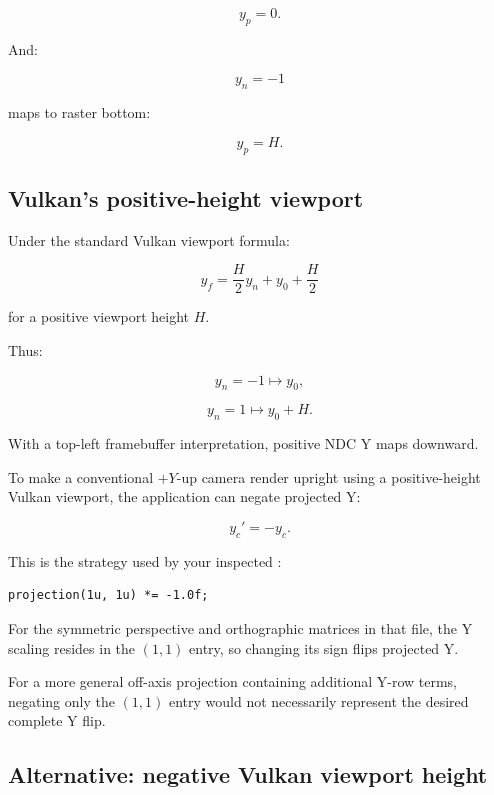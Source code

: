 \[
 y_p=0.
\]

And:

\[
 y_n=-1
\]

maps to raster bottom:

\[
 y_p=H.
\]

\subsection{Vulkan's positive-height viewport}\label{02-foundations-ii-ch033-vulkans-positive-height-viewport}

\hypertarget{02-foundations-ii-ch033-vulkans-positive-height-viewport}{}

Under the standard Vulkan viewport formula:

\[
 y_f=\frac{H}{2}y_n+y_0+\frac H2
\]

for a positive viewport height \(H\).

Thus:

\[
 y_n=-1\mapsto y_0,
\]

\[
 y_n=1\mapsto y_0+H.
\]

With a top-left framebuffer interpretation, positive NDC Y maps downward.

To make a conventional \(+Y\)-up camera render upright using a positive-height Vulkan viewport, the application can negate projected Y:

\[
 \boxed{ y_c'=-y_c }.
\]

This is the strategy used by your inspected :

\begin{verbatim}
projection(1u, 1u) *= -1.0f;
\end{verbatim}

For the symmetric perspective and orthographic matrices in that file, the Y scaling resides in the \((1,1)\) entry, so changing its sign flips projected Y.

For a more general off-axis projection containing additional Y-row terms, negating only the \((1,1)\) entry would not necessarily represent the desired complete Y flip.

\subsection{Alternative: negative Vulkan viewport height}\label{02-foundations-ii-ch033-alternative-negative-vulkan-viewport-height}

\hypertarget{02-foundations-ii-ch033-alternative-negative-vulkan-viewport-height}{}

